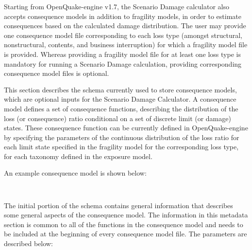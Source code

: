 Starting from OpenQuake-engine v1.7, the Scenario Damage calculator also
accepts \glspl{consequence model} in addition to \glspl{fragility model}, in
order to estimate consequences based on the calculated damage distribution.
The user may provide one \gls{consequence model} file corresponding to each
loss type (amongst structural, nonstructural, contents, and business
interruption) for which a fragility model file is provided. Whereas providing
a \gls{fragility model} file for at least one loss type is mandatory for
running a Scenario Damage calculation, providing corresponding
\gls{consequence model} files is optional.

This section describes the schema currently used to store \glspl{consequence
model}, which are optional inputs for the Scenario Damage Calculator. A
\gls{consequence model} defines a set of \glspl{consequence function},
describing the distribution of the loss (or consequence) ratio conditional on
a set of discrete limit (or damage) states. These \gls{consequence function}
can be currently defined in OpenQuake-engine by specifying the parameters of
the continuous distribution of the loss ratio for each limit state specified
in the fragility model for the corresponding loss type, for each taxonomy
defined in the exposure model.

An example consequence model is shown below:

\inputminted[firstline=1,firstnumber=1,fontsize=\footnotesize,frame=single,linenos,bgcolor=lightgray]{xml}{oqum/risk/Verbatim/input_consequence.xml}\\	

The initial portion of the schema contains general information that describes
some general aspects of the \gls{consequence model}. The information in this
metadata section is common to all of the functions in the \gls{consequence
model} and needs to be included at the beginning of every \gls{consequence
model} file. The parameters are described below:

